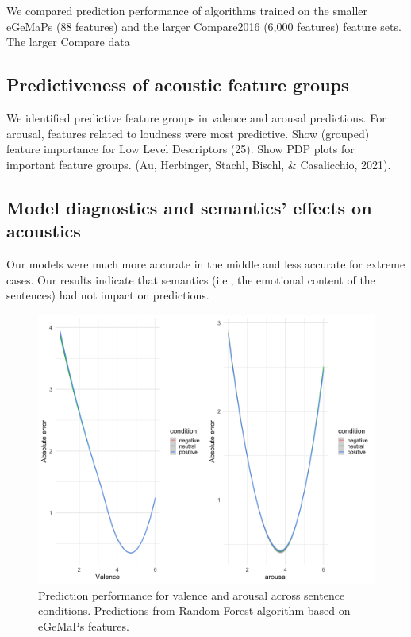 \documentclass[
  english,
  man,floatsintext]{apa6}
\begin{document}
We compared prediction performance of algorithms trained on the smaller eGeMaPs (88 features) and the larger Compare2016 (6,000 features) feature sets. The larger Compare data

\hypertarget{predictiveness-of-acoustic-feature-groups}{%
\subsection{Predictiveness of acoustic feature groups}\label{predictiveness-of-acoustic-feature-groups}}

We identified predictive feature groups in valence and arousal predictions. For arousal, features related to loudness were most predictive. Show (grouped) feature importance for Low Level Descriptors (25). Show PDP plots for important feature groups. (Au, Herbinger, Stachl, Bischl, \& Casalicchio, 2021).

\hypertarget{model-diagnostics-and-semantics-effects-on-acoustics}{%
\subsection{Model diagnostics and semantics' effects on acoustics}\label{model-diagnostics-and-semantics-effects-on-acoustics}}

Our models were much more accurate in the middle and less accurate for extreme cases.
Our results indicate that semantics (i.e., the emotional content of the sentences) had not impact on predictions.

\begin{figure}
\centering
\includegraphics{../figures/performance_condtion.png}
\caption{Prediction performance for valence and arousal across sentence conditions. Predictions from Random Forest algorithm based on eGeMaPs features.}
\end{figure}
\end{document}
